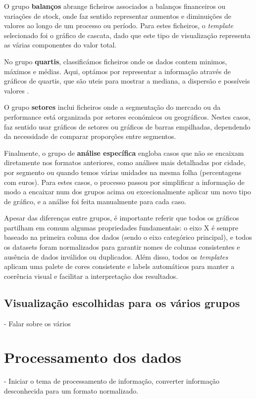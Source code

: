 O grupo \textbf{balanços} abrange ficheiros associados a balanços financeiros ou variações de stock, onde faz sentido representar aumentos e diminuições de valores ao longo de um processo ou período. Para estes ficheiros, o \textit{template} selecionado foi o gráfico de cascata, dado que este tipo de visualização representa as várias componentes do valor total.

No grupo \textbf{quartis}, classificámos ficheiros onde os dados contem minimos, máximos e médias. Aqui, optámos por representar a informação através de gráficos de quartis, que são uteis para mostrar a mediana, a dispersão e possíveis valores .

O grupo \textbf{setores} inclui ficheiros onde a segmentação do mercado ou da performance está organizada por setores económicos ou geográficos. Nestes casos, faz sentido usar gráficos de setores ou gráficos de barras empilhadas, dependendo da necessidade de comparar proporções entre segmentos.

Finalmente, o grupo de \textbf{análise específica} engloba casos que não se encaixam diretamente nos formatos anteriores, como análises mais detalhadas por cidade, por segmento ou quando temos várias unidades na mesma folha (percentagens com euros). Para estes casos, o processo passou por simplificar a informação de modo a encaixar num dos grupos acima ou excecionalmente aplicar um novo tipo de gráfico, e a análise foi feita manualmente para cada caso.

Apesar das diferenças entre grupos, é importante referir que todos os gráficos partilham em comum algumas propriedades fundamentais: o eixo X é sempre baseado na primeira coluna dos dados (sendo o eixo categórico principal), e todos os datasets foram normalizados para garantir nomes de colunas consistentes e ausência de dados inválidos ou duplicados. Além disso, todos os \textit{templates} aplicam uma palete de cores consistente e labels automáticos para manter a coerência visual e facilitar a interpretação dos resultados.


\subsection{Visualização escolhidas para os vários grupos}
- Falar sobre os vários

\section{Processamento dos dados}
- Iniciar o tema de processamento de informação, converter informação desconhecida para um formato normalizado.


